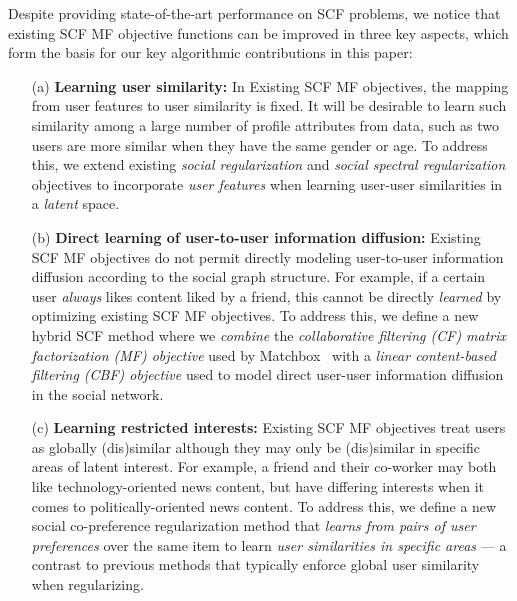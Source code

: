 Despite providing state-of-the-art performance on SCF problems, we
notice that existing SCF MF objective functions can be improved in
three key aspects, which form the basis for our key algorithmic
contributions in this paper:
\begin{enumerate}
\item[(a)] {\bf Learning user similarity:}
In Existing SCF MF objectives, the mapping from user features to user
similarity is fixed.  It will be desirable to learn such similarity
among a large number of profile attributes from data, such as two
users are more similar when they have the same gender or age.
To address this, we extend existing \emph{social regularization} and
\emph{social spectral regularization} objectives to incorporate
\emph{user features} when learning user-user similarities in a
\emph{latent} space.
\item[(b)] {\bf Direct learning of user-to-user information diffusion:}
Existing SCF MF objectives do not permit directly modeling
user-to-user information diffusion according to the social graph
structure.  For example, if a certain user \emph{always} likes content
liked by a friend, this cannot be directly \emph{learned} by
optimizing existing SCF MF objectives.
To address this, we define a new hybrid SCF method where we
\emph{combine} the \emph{collaborative filtering (CF) matrix
factorization (MF) objective} used by Matchbox~\cite{matchbox} with a
\emph{linear content-based filtering (CBF) objective} used to model
direct user-user information diffusion in the social network.
\item[(c)] {\bf Learning restricted interests:} 
Existing SCF MF objectives treat users as globally (dis)similar
although they may only be (dis)similar in specific areas of latent interest.
For example, a friend and their co-worker may both like
technology-oriented news content, but have differing interests when it
comes to politically-oriented news content.
To address this, we define a new social co-preference regularization
method that \emph{learns from pairs of user preferences} over the same
item to learn \emph{user similarities in specific areas} --- a
contrast to previous methods that typically enforce global user
similarity when regularizing.
\end{enumerate}

